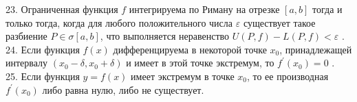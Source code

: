 \documentclass[12pt]{article}
\begin{document}
23. Ограниченная функция ${\displaystyle f}$  интегрируема по Риману на отрезке ${\displaystyle [a,b]}$ тогда и только тогда, когда для любого положительного числа ${\displaystyle \varepsilon}$ существует такое разбиение ${\displaystyle P\in \sigma[a,b]}$, что выполняется неравенство ${\displaystyle U(P,f) - L(P,f) < \varepsilon}$ .\\

24. Если функция ${\displaystyle f(x)}$ дифференцируема в некоторой точке  ${\displaystyle x_0}$, принадлежащей интервалу ${\displaystyle (x_0-\delta,x_0+\delta)}$ и имеет в этой точке экстремум, то ${\displaystyle f^{\prime}(x_0)=0}$ .\\

25. Если функция ${\displaystyle y=f(x)}$ имеет экстремум в точке ${\displaystyle x_0}$, то ее производная ${\displaystyle f^{\prime}(x_0)}$ либо равна нулю, либо не существует.\\
\end{document}
